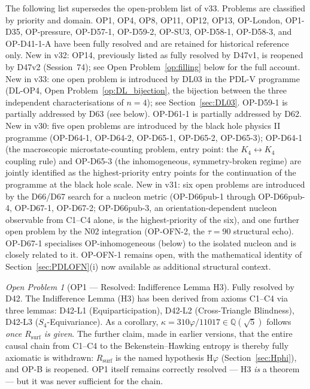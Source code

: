 \documentclass[11pt,a4paper]{article}
\theoremstyle{plain}
\theoremstyle{definition}
\theoremstyle{remark}
\newtheorem{openproblem}[theorem]{Open Problem}
\newcommand{\Rsurf}{R_{\mathrm{surf}}}
\begin{document}
The following list supersedes the open-problem list of v33. Problems are classified by priority and domain. OP1, OP4, OP8, OP11, OP12, OP13, OP-London, OP1-D35, OP-pressure, OP-D57-1, OP-D59-2, OP-SU3, OP-D58-1, OP-D58-3, and OP-D41-1-A have been fully resolved and are retained for historical reference only. \textcolor{negativered}{New in v32: OP14, previously listed as fully resolved by D47v1, is reopened by D47v2 (Session~74); see Open Problem~\ref{op:filling} below for the full account.} New in v33: one open problem is introduced by DL03 in the PDL-V programme (DL-OP4, Open Problem~\ref{op:DL_bijection}, the bijection between the three independent characterisations of $n=4$); see Section~\ref{sec:DL03}. OP-D59-1 is partially addressed by D63 (see below). OP-D61-1 is partially addressed by D62. New in v30: five open problems are introduced by the black hole physics II programme (OP-D64-1, OP-D64-2, OP-D65-1, OP-D65-2, OP-D65-3); OP-D64-1 (the macroscopic microstate-counting problem, entry point: the $K_4\leftrightarrow K_4$ coupling rule) and OP-D65-3 (the inhomogeneous, symmetry-broken regime) are jointly identified as the highest-priority entry points for the continuation of the programme at the black hole scale. New in v31: six open problems are introduced by the D66/D67 search for a nucleon metric (OP-D66pub-1 through OP-D66pub-4, OP-D67-1, OP-D67-2; OP-D66pub-3, an orientation-dependent nucleon observable from C1--C4 alone, is the highest-priority of the six), and one further open problem by the N02 integration (OP-OFN-2, the $\tau=90$ structural echo). OP-D67-1 specialises OP-inhomogeneous (below) to the isolated nucleon and is closely related to it. OP-OFN-1 remains open, with the mathematical identity of Section~\ref{sec:PDLOFN}(i) now available as additional structural context.

\begin{openproblem}[OP1 --- Resolved: Indifference Lemma H3]
\label{op:H3}
\textcolor{proofblue}{Fully resolved by D42.} The Indifference Lemma (H3) has been derived from axioms C1--C4 via three lemmas: D42-L1 (Equiparticipation), D42-L2 (Cross-Triangle Blindness), D42-L3 ($S_4$-Equivariance). As a corollary, $\kappa=310\varphi/11017\in\mathbb{Q}(\sqrt{5})$ follows \emph{once $\Rsurf$ is given}. \textcolor{negativered}{The further claim, made in earlier versions, that the entire causal chain from C1--C4 to the Bekenstein--Hawking entropy is thereby fully axiomatic is withdrawn: $\Rsurf$ is the named hypothesis H$\varphi$ (Section~\ref{sec:Hphi}), and OP-B is reopened. OP1 itself remains correctly resolved --- H3 \emph{is} a theorem --- but it was never sufficient for the chain.}
\end{openproblem}
\end{document}
